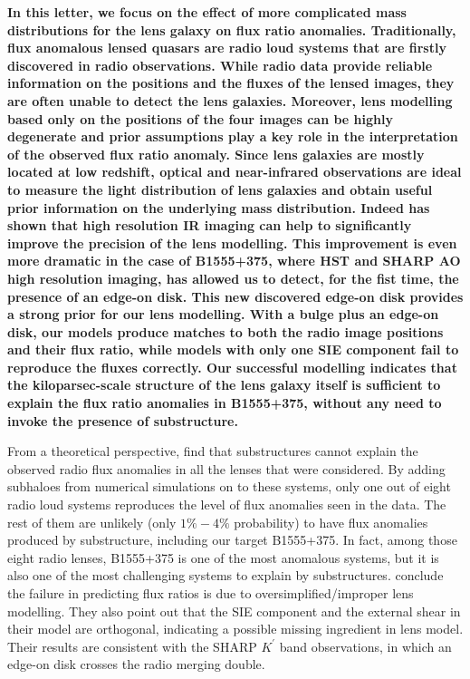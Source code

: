 \documentclass[useAMS,usenatbib]{mn2e}
\begin{document}
{\bf In this letter, we focus on the effect of more complicated mass distributions for the lens galaxy on flux ratio anomalies.
Traditionally, flux anomalous lensed quasars are radio loud systems that are firstly discovered in radio observations. While radio data provide reliable information on the positions and the fluxes of the lensed images, they are often unable to detect the lens galaxies. Moreover, lens modelling based only on the positions of the four images can be highly degenerate and prior assumptions play a key role in the interpretation of the observed flux ratio anomaly.
Since lens galaxies are mostly located at low redshift, optical and near-infrared observations are ideal to measure the light distribution of lens galaxies and obtain useful prior information  
on the underlying mass distribution. Indeed \citet{SHARP12} has shown that high resolution IR imaging can help to significantly improve the precision of the lens modelling. This improvement is even more dramatic in the case of B1555+375, where HST and SHARP AO high resolution imaging, has allowed us to detect, for the fist time, the presence of an edge-on disk. This new discovered edge-on disk provides a strong prior for our lens modelling.  With a bulge plus an edge-on disk, our models produce matches to both the radio image
positions and their flux ratio, while models with only one SIE component \citep{Marlow99,Xu14} fail to reproduce the fluxes correctly. Our successful modelling indicates that the
kiloparsec-scale structure of the lens galaxy itself is sufficient to explain the flux ratio anomalies in B1555+375, without any need to invoke the presence of substructure.  }

From a theoretical perspective, \citet{Xu14} find that substructures
cannot explain the observed radio flux anomalies in all the lenses
that were considered. By adding subhaloes from numerical simulations
on to these systems, only one out of eight radio loud systems
reproduces the level of flux anomalies seen in the data.  The rest of
them are unlikely (only $1 \% - 4 \%$ probability) to have flux
anomalies produced by substructure, including our target B1555+375.
In fact, among those eight radio lenses, B1555+375 is one of the most
anomalous systems, but it is also one of the most challenging systems
to explain by substructures. \citet{Xu14} conclude the failure in
predicting flux ratios is due to oversimplified/improper lens
modelling. They also point out that the SIE component and the external
shear in their model are orthogonal, indicating a possible missing
ingredient in lens model. Their results are consistent with the SHARP
$K^{\prime}$ band observations, in which an edge-on disk crosses the
radio merging double. 
\end{document}
